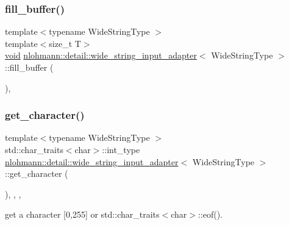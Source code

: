 \subsubsection{\texorpdfstring{fill\+\_\+buffer()}{fill\_buffer()}}
{\footnotesize\ttfamily template$<$typename Wide\+String\+Type $>$ \\
template$<$size\+\_\+t T$>$ \\
\hyperlink{namespacenlohmann_1_1detail_a59fca69799f6b9e366710cb9043aa77d}{void} \hyperlink{classnlohmann_1_1detail_1_1wide__string__input__adapter}{nlohmann\+::detail\+::wide\+\_\+string\+\_\+input\+\_\+adapter}$<$ Wide\+String\+Type $>$\+::fill\+\_\+buffer (\begin{DoxyParamCaption}{ }\end{DoxyParamCaption})\hspace{0.3cm}{\ttfamily [inline]}, {\ttfamily [private]}}

\mbox{\label{classnlohmann_1_1detail_1_1wide__string__input__adapter_abb62b34cf77e557ce5321b7f2490c3b0}} 
\subsubsection{\texorpdfstring{get\+\_\+character()}{get\_character()}}
{\footnotesize\ttfamily template$<$typename Wide\+String\+Type $>$ \\
std\+::char\+\_\+traits$<$char$>$\+::int\+\_\+type \hyperlink{classnlohmann_1_1detail_1_1wide__string__input__adapter}{nlohmann\+::detail\+::wide\+\_\+string\+\_\+input\+\_\+adapter}$<$ Wide\+String\+Type $>$\+::get\+\_\+character (\begin{DoxyParamCaption}{ }\end{DoxyParamCaption})\hspace{0.3cm}{\ttfamily [inline]}, {\ttfamily [override]}, {\ttfamily [virtual]}, {\ttfamily [noexcept]}}



get a character \mbox{[}0,255\mbox{]} or std\+::char\+\_\+traits$<$char$>$\+::eof(). 



